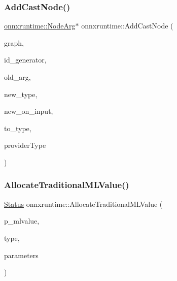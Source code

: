 \mbox{\label{namespaceonnxruntime_a65809a4c4e9abacbeee16e775c146f14}} 
\subsubsection{\texorpdfstring{Add\+Cast\+Node()}{AddCastNode()}}
{\footnotesize\ttfamily \mbox{\hyperlink{classonnxruntime_1_1NodeArg}{onnxruntime\+::\+Node\+Arg}}$\ast$ onnxruntime\+::\+Add\+Cast\+Node (\begin{DoxyParamCaption}\item[{\mbox{\hyperlink{classonnxruntime_1_1Graph}{onnxruntime\+::\+Graph}} \&}]{graph,  }\item[{\mbox{\hyperlink{classonnxruntime_1_1IdGenerator}{Id\+Generator}} \&}]{id\+\_\+generator,  }\item[{\mbox{\hyperlink{classonnxruntime_1_1NodeArg}{onnxruntime\+::\+Node\+Arg}} $\ast$}]{old\+\_\+arg,  }\item[{Type\+Proto $\ast$}]{new\+\_\+type,  }\item[{bool}]{new\+\_\+on\+\_\+input,  }\item[{int64\+\_\+t}]{to\+\_\+type,  }\item[{\mbox{\hyperlink{namespaceonnxruntime_a863e2227cbf32aab76aad35fdadff4bb}{onnxruntime\+::\+Provider\+Type}}}]{provider\+Type }\end{DoxyParamCaption})}

\mbox{\label{namespaceonnxruntime_a685b8fa8faa1d4931b5f4dde7b54de0f}} 
\subsubsection{\texorpdfstring{Allocate\+Traditional\+M\+L\+Value()}{AllocateTraditionalMLValue()}}
{\footnotesize\ttfamily \mbox{\hyperlink{classonnxruntime_1_1common_1_1Status}{Status}} onnxruntime\+::\+Allocate\+Traditional\+M\+L\+Value (\begin{DoxyParamCaption}\item[{\mbox{\hyperlink{classonnxruntime_1_1MLValue}{M\+L\+Value}} $\ast$}]{p\+\_\+mlvalue,  }\item[{const \mbox{\hyperlink{classonnxruntime_1_1NonTensorTypeBase}{Non\+Tensor\+Type\+Base}} $\ast$}]{type,  }\item[{const \mbox{\hyperlink{structonnxruntime_1_1MLValueAllocationParameters}{M\+L\+Value\+Allocation\+Parameters}} \&}]{parameters }\end{DoxyParamCaption})}

